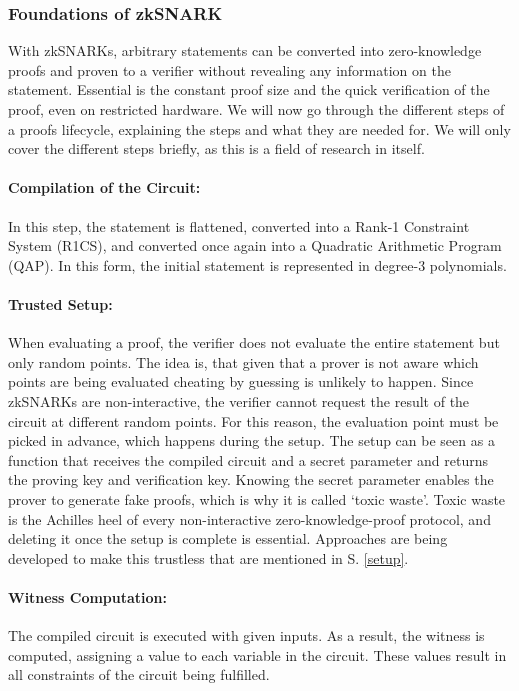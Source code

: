 \documentclass[../../thesis.tex]{subfiles}
\begin{document}
\subsubsection{Foundations of zkSNARK}
With zkSNARKs, arbitrary statements can be converted into zero-knowledge proofs and proven to a verifier without revealing any information on the statement. Essential is the constant proof size and the quick verification of the proof, even on restricted hardware. We will now go through the different steps of a proofs lifecycle, explaining the steps and what they are needed for. We will only cover the different steps briefly, as this is a field of research in itself.

\paragraph{Compilation of the Circuit:}
In this step, the statement is flattened, converted into a Rank-1 Constraint System (R1CS), and converted once again into a Quadratic Arithmetic Program (QAP). In this form, the initial statement is represented in degree-3 polynomials.

\paragraph{Trusted Setup:}
When evaluating a proof, the verifier does not evaluate the entire statement but only random points. The idea is, that given that a prover is not aware which points are being evaluated cheating by guessing is unlikely to happen. Since zkSNARKs are non-interactive, the verifier cannot request the result of the circuit at different random points. For this reason, the evaluation point must be picked in advance, which happens during the setup. The setup can be seen as a function that receives the compiled circuit and a secret parameter and returns the proving key and verification key. Knowing the secret parameter enables the prover to generate fake proofs, which is why it is called `toxic waste'. Toxic waste is the Achilles heel of every non-interactive zero-knowledge-proof protocol, and deleting it once the setup is complete is essential. Approaches are being developed to make this trustless that are mentioned in S. \ref{setup}.

\paragraph{Witness Computation:}
The compiled circuit is executed with given inputs. As a result, the witness is computed, assigning a value to each variable in the circuit. These values result in all constraints of the circuit being fulfilled.
\end{document}
